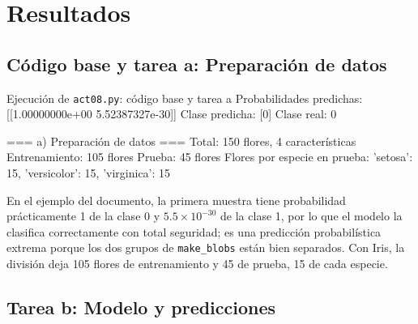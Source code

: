 \documentclass[11pt,letterpaper]{article}
\begin{document}
\clearpage
\section{Resultados}

\subsection{Código base y tarea a: Preparación de datos}

\begin{consola}[label=out:a]{Ejecución de \texttt{act08.py}: código base y tarea a}
Probabilidades predichas: [[1.00000000e+00 5.52387327e-30]]
Clase predicha: [0]
Clase real: 0

=== a) Preparación de datos ===
Total: 150 flores, 4 características
Entrenamiento: 105 flores   Prueba: 45 flores
Flores por especie en prueba: {'setosa': 15, 'versicolor': 15, 'virginica': 15}
\end{consola}

En el ejemplo del documento, la primera muestra tiene probabilidad prácticamente 1 de la clase 0 y $5.5 \times 10^{-30}$ de la clase 1, por lo que el modelo la clasifica correctamente con total seguridad; es una predicción probabilística extrema porque los dos grupos de \texttt{make\_blobs} están bien separados. Con Iris, la división deja 105 flores de entrenamiento y 45 de prueba, 15 de cada especie.

\subsection{Tarea b: Modelo y predicciones}
\end{document}
